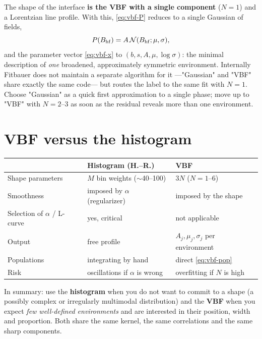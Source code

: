 The  shape of the interface \textbf{is the VBF with a single
component} ($N=1$) and a Lorentzian line profile. With this, \eqref{eq:vbf-P}
reduces to a single Gaussian of fields,
\begin{equation}
  P(B_{\mathrm{hf}}) = A\,\mathcal N(B_{\mathrm{hf}};\mu,\sigma),
\end{equation}
and the parameter vector \eqref{eq:vbf-x} to $(b,s,A,\mu,\log\sigma)$: the minimal
description of \emph{one} broadened, approximately symmetric environment.
Internally Fitbauer does not maintain a separate algorithm for it —"Gaussian" and
"VBF" share exactly the same code— but routes the label to the same fit with
$N=1$. Choose "Gaussian" as a quick first approximation to a single phase; move up
to "VBF" with $N=2$--$3$ as soon as the residual reveals more than one
environment.

\section{VBF versus the histogram}
\label{sec:vbf-vs-hist}

\begin{center}
\small
\begin{tabular}{@{}p{}p{}p{}@{}}
\toprule
 & \textbf{Histogram (H.--R.)} & \textbf{VBF} \\
\midrule
Shape parameters & $M$ bin weights ($\sim$40--100) & $3N$ ($N=1$--$6$) \\
Smoothness & imposed by $\alpha$ (regularizer) & imposed by the shape \\
Selection of $\alpha$ / L-curve & yes, critical & not applicable \\
Output & free profile & $A_j,\mu_j,\sigma_j$ per environment \\
Populations & integrating by hand & direct \eqref{eq:vbf-pop} \\
Risk & oscillations if $\alpha$ is wrong & overfitting if $N$ is high \\
\bottomrule
\end{tabular}
\end{center}

In summary: use the \textbf{histogram} when you do not want to commit to a shape
(a possibly complex or irregularly multimodal distribution) and the \textbf{VBF}
when you expect \emph{few well-defined environments} and are interested in their
position, width and proportion. Both share the same kernel, the same correlations
and the same sharp components.

